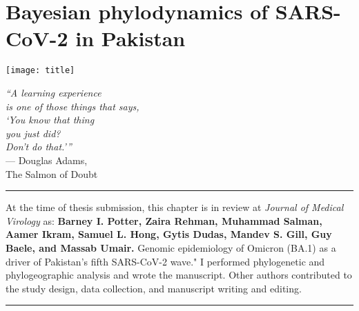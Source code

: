 \chapter{Bayesian phylodynamics of SARS-CoV-2 in Pakistan}\label{ch:chapter2}

\begin{minipage}[b]{0.6\textwidth}
    \texttt{[image: title]} %
  \end{minipage}
  \hfill
  \begin{minipage}[b]{0.32\textwidth}
    \footnotesize
    \begin{flushright}
      \textit{``A learning experience\\is one of those things that says,\\`You know that thing\\you just did?\\Don't do that.'\thinspace''} \\
      --- Douglas Adams, \\The Salmon of Doubt
    \end{flushright}
    \vspace{2cm}
  \end{minipage}
  
  \clearpage

\hrule
\vspace*{12pt}
At the time of thesis submission, this chapter is in review at \textit{Journal of Medical Virology} as: \textbf{Barney I. Potter, Zaira Rehman, Muhammad Salman, Aamer Ikram, Samuel L. Hong, Gytis Dudas, Mandev S. Gill, Guy Baele, and Massab Umair.} Genomic epidemiology of Omicron (BA.1) as a driver of Pakistan's fifth SARS-CoV-2 wave."
I performed phylogenetic and phylogeographic analysis and wrote the manuscript.
Other authors contributed to the study design, data collection, and manuscript writing and editing.
\vspace*{12pt}
\hrule

\onehalfspacing

